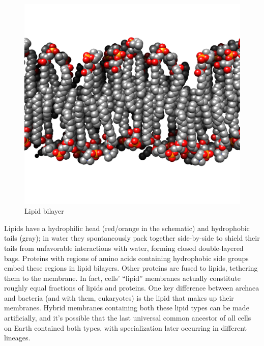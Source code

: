 \documentclass[]{tufte-book}
\begin{document}
\begin{figure}
\includegraphics{img/02_schematic/2_1_1_LipidBilayer} \caption[Lipid bilayer]{Lipid bilayer}\label{fig:2-1-1}
\end{figure}

Lipids have a hydrophilic head (red/orange in the schematic) and
hydrophobic tails (gray); in water they spontaneously pack together
side-by-side to shield their tails from unfavorable interactions with
water, forming closed double-layered bags. Proteins with regions of
amino acids containing hydrophobic side groups embed these regions in
lipid bilayers. Other proteins are fused to lipids, tethering them to
the membrane. In fact, cells' ``lipid'' membranes actually constitute
roughly equal fractions of lipids and proteins. One key difference
between archaea and bacteria (and with them, eukaryotes) is the lipid
that makes up their membranes. Hybrid membranes containing both these
lipid types can be made artificially, and it's possible that the last
universal common ancestor of all cells on Earth contained both types,
with specialization later occurring in different lineages.
\end{document}
